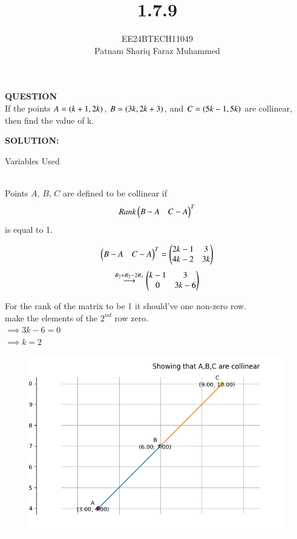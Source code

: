 \documentclass[journal]{IEEEtran}
\numberwithin{equation}{enumi}
\numberwithin{figure}{enumi}
\begin{document}


\title{1.7.9}
\author{EE24BTECH11049 \\ Patnam Shariq Faraz Muhammed}

{\let\newpage\relax\maketitle}

\textbf{QUESTION} \\
	If the points $A = \left(k + 1, 2k\right)$, $B = \left(3k, 2k + 3\right)$, and $C = \left(5k - 1, 5k\right)$ are collinear, then find the value of k.

\textbf{SOLUTION:} \\
\begin{table}[h!]    
  \centering
  
  \caption{Variables Used}
  \label{table: 1.7.9.1}
\end{table}\\
	
        Points $A$, $B$, $C$ are defined to be collinear if
        \begin{align*}
        Rank\begin{pmatrix}B - A & C - A\end{pmatrix}^{T}
        \end{align*}
        is equal to 1.

    
        \begin{center}
        \begin{align}
        \begin{pmatrix}B - A & C - A\end{pmatrix}^{T} = \begin{pmatrix}2k-1 & 3 \\ 4k-2 & 3k\end{pmatrix} 
        \end{align}
        \begin{align}
        \overset{R_2=R_2-2R_1}{\longrightarrow} \begin{pmatrix}k-1 & 3 \\ 0 & 3k-6\end{pmatrix}
        \end{align}
        
        For the rank of the matrix to be 1 it should've one non-zero row.\\ 
        make the elements of the $2^{nd}$ row zero.\\
        $\implies 3k-6 = 0$ \\
        $\implies k = 2$ \\
        \end{center}
        
        \begin{figure}[h]
        \centering
        \includegraphics[width=0.7\linewidth]{figs/fig.png}
        \caption{}
        \label{graph}
    	\end{figure}
\end{document}
